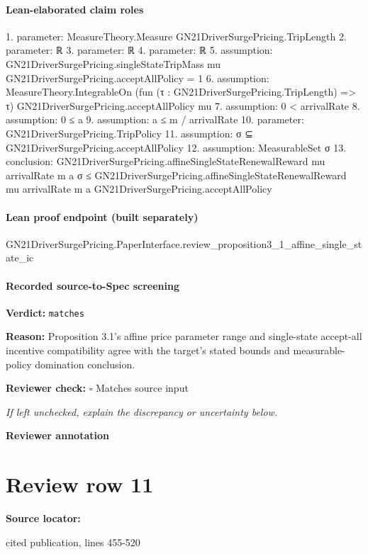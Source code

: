 \documentclass[10pt]{article}
\newcommand{\reviewerbox}{%
  \par\noindent\fbox{\parbox{0.96\linewidth}{\rule{0pt}{0.38in}}}\par
}
\newcommand{\reviewmatch}[1]{%
  \par\noindent\textbf{Reviewer check:} $\square$\; #1\par
  \noindent\emph{If left unchecked, explain the discrepancy or uncertainty below.}\par
}
\begin{document}
\paragraph{Lean-elaborated claim roles}\begin{ReviewVerbatim}
1. parameter: MeasureTheory.Measure GN21DriverSurgePricing.TripLength
2. parameter: ℝ
3. parameter: ℝ
4. parameter: ℝ
5. assumption: GN21DriverSurgePricing.singleStateTripMass mu GN21DriverSurgePricing.acceptAllPolicy = 1
6. assumption: MeasureTheory.IntegrableOn (fun (τ : GN21DriverSurgePricing.TripLength) => τ) GN21DriverSurgePricing.acceptAllPolicy mu
7. assumption: 0 < arrivalRate
8. assumption: 0 ≤ a
9. assumption: a ≤ m / arrivalRate
10. parameter: GN21DriverSurgePricing.TripPolicy
11. assumption: σ ⊆ GN21DriverSurgePricing.acceptAllPolicy
12. assumption: MeasurableSet σ
13. conclusion: GN21DriverSurgePricing.affineSingleStateRenewalReward mu arrivalRate m a σ ≤
  GN21DriverSurgePricing.affineSingleStateRenewalReward mu arrivalRate m a GN21DriverSurgePricing.acceptAllPolicy
\end{ReviewVerbatim}

\paragraph{Lean proof endpoint (built separately)}\begin{ReviewVerbatim}
GN21DriverSurgePricing.PaperInterface.review_proposition3_1_affine_single_state_ic
\end{ReviewVerbatim}

\paragraph{Recorded source-to-Spec screening}
\textbf{Verdict:} \texttt{matches}
\\
{\raggedright
\textbf{Reason:} Proposition 3.\allowbreak{}1's affine price parameter range and single-\allowbreak{}state accept-\allowbreak{}all incentive compatibility agree with the target's stated bounds and measurable-\allowbreak{}policy domination conclusion.\allowbreak{}
\par}
\reviewmatch{Matches source input}
\noindent\textbf{Reviewer annotation}\par
\reviewerbox
\clearpage
\hypertarget{source-claim-cdbb75fcd67baff3}{}
\section*{Review row 11}
\textbf{Source locator:} {\footnotesize\raggedright cited publication, lines 455-\allowbreak{}520\par}
\end{document}
